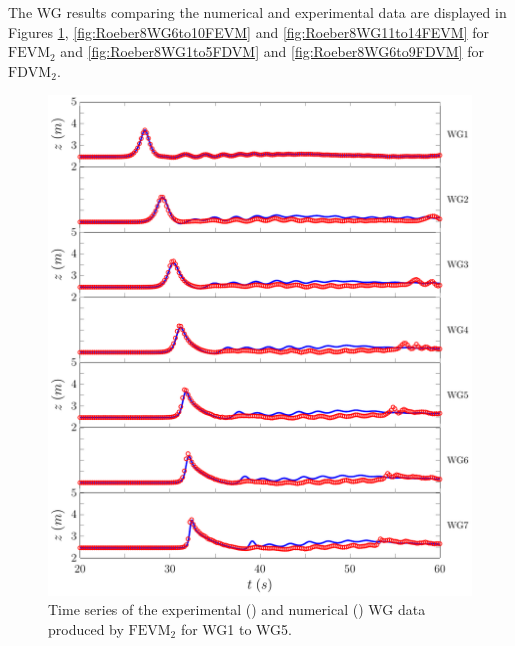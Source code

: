 The WG results comparing the numerical and experimental data are displayed in Figures \ref{fig:Roeber8WG1to5FEVM}, \ref{fig:Roeber8WG6to10FEVM} and \ref{fig:Roeber8WG11to14FEVM} for $\text{FEVM}_2$ and \ref{fig:Roeber8WG1to5FDVM} and \ref{fig:Roeber8WG6to9FDVM} for $\text{FDVM}_2$.
\begin{figure}
	\centering
	\includegraphics[width=\textwidth]{./chp6/figures/Experiment/Roeber/Trial8/FEVM/LongWGs1.pdf}
	\caption{Time series of the experimental () and numerical ({\color{blue}\solidrule}) WG data produced by $\text{FEVM}_2$ for WG1 to WG5.}
	\label{fig:Roeber8WG1to5FEVM}
\end{figure}
